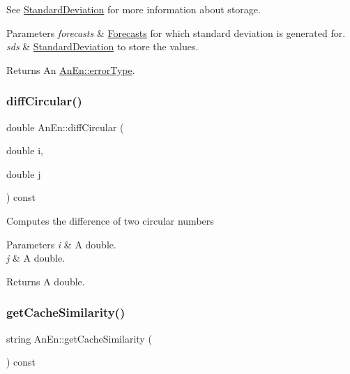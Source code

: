 See \mbox{\hyperlink{class_standard_deviation}{Standard\+Deviation}} for more information about storage.


\begin{DoxyParams}{Parameters}
{\em forecasts} & \mbox{\hyperlink{class_forecasts}{Forecasts}} for which standard deviation is generated for. \\
\hline
{\em sds} & \mbox{\hyperlink{class_standard_deviation}{Standard\+Deviation}} to store the values. \\
\hline
\end{DoxyParams}
\begin{DoxyReturn}{Returns}
An \mbox{\hyperlink{class_an_en_a0e256eb89d102d318a47d936b02242bf}{An\+En\+::error\+Type}}. 
\end{DoxyReturn}
\mbox{\label{class_an_en_a0d0293f2d6a92c95919a937422dc86a9}} 
\subsubsection{\texorpdfstring{diff\+Circular()}{diffCircular()}}
{\footnotesize\ttfamily double An\+En\+::diff\+Circular (\begin{DoxyParamCaption}\item[{double}]{i,  }\item[{double}]{j }\end{DoxyParamCaption}) const}

Computes the difference of two circular numbers


\begin{DoxyParams}{Parameters}
{\em i} & A double. \\
\hline
{\em j} & A double. \\
\hline
\end{DoxyParams}
\begin{DoxyReturn}{Returns}
A double. 
\end{DoxyReturn}
\mbox{\label{class_an_en_aca0d81de024426ac3e2950cffa1f2cd5}} 
\subsubsection{\texorpdfstring{get\+Cache\+Similarity()}{getCacheSimilarity()}}
{\footnotesize\ttfamily string An\+En\+::get\+Cache\+Similarity (\begin{DoxyParamCaption}{ }\end{DoxyParamCaption}) const}

